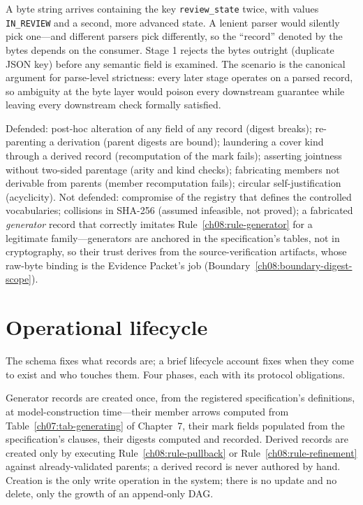 \begin{example}\label{ch08:ex-dupkey}
A byte string arrives containing the key \texttt{review\_state} twice, with values \texttt{IN\_REVIEW} and a second, more advanced state. A lenient parser would silently pick one---and different parsers pick differently, so the ``record'' denoted by the bytes depends on the consumer. Stage 1 rejects the bytes outright (duplicate JSON key) before any semantic field is examined. The scenario is the canonical argument for parse-level strictness: every later stage operates on a parsed record, so ambiguity at the byte layer would poison every downstream guarantee while leaving every downstream check formally satisfied.
\end{example}

\begin{threat}\label{ch08:threat-model}
Defended: post-hoc alteration of any field of any record (digest breaks); re-parenting a derivation (parent digests are bound); laundering a cover kind through a derived record (recomputation of the mark fails); asserting jointness without two-sided parentage (arity and kind checks); fabricating members not derivable from parents (member recomputation fails); circular self-justification (acyclicity). Not defended: compromise of the registry that defines the controlled vocabularies; collisions in SHA-256 (assumed infeasible, not proved); a fabricated \emph{generator} record that correctly imitates Rule~\ref{ch08:rule-generator} for a legitimate family---generators are anchored in the specification's tables, not in cryptography, so their trust derives from the source-verification artifacts, whose raw-byte binding is the Evidence Packet's job (Boundary~\ref{ch08:boundary-digest-scope}).
\end{threat}

\section{Operational lifecycle}\label{ch08:sec-lifecycle}

The schema fixes what records are; a brief lifecycle account fixes when they come to exist and who touches them. Four phases, each with its protocol obligations.

\begin{protocol}[Creation]\label{ch08:proto-creation}
Generator records are created once, from the registered specification's definitions, at model-construction time---their member arrows computed from Table~\ref{ch07:tab-generating} of Chapter~7, their mark fields populated from the specification's clauses, their digests computed and recorded. Derived records are created only by executing Rule~\ref{ch08:rule-pullback} or Rule~\ref{ch08:rule-refinement} against already-validated parents; a derived record is never authored by hand. Creation is the only write operation in the system; there is no update and no delete, only the growth of an append-only DAG.
\end{protocol}

